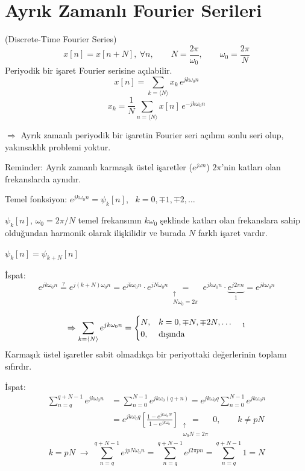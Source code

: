 \documentclass[11pt,a4paper]{article}
\begin{document}

\section{Ayrık Zamanlı Fourier Serileri}
(Discrete-Time Fourier Series)
\[ x[n]=x[n+N],\ \forall n, \qquad N=\frac{2\pi}{\omega_0}, \qquad \omega_0=\frac{2\pi}{N} \]
Periyodik bir işaret Fourier serisine açılabilir.
\[ x[n]=\sum_{k=\langle N\rangle} x_k\, e^{jk\omega_0 n} \]
\[ x_k=\frac{1}{N}\sum_{n=\langle N\rangle} x[n]\, e^{-jk\omega_0 n} \]

$\Rightarrow$ Ayrık zamanlı periyodik bir işaretin Fourier seri açılımı sonlu seri olup, yakınsaklık problemi yoktur.

Reminder: Ayrık zamanlı karmaşık üstel işaretler ($e^{j\omega n}$) $2\pi$'nin katları olan frekanslarda aynıdır.

Temel fonksiyon: $e^{jk\omega_0 n}=\psi_k[n]$, \ $k=0,\mp1,\mp2,\dots$

$\psi_k[n]$, $\omega_0=2\pi/N$ temel frekansının $k\omega_0$ şeklinde katları olan frekanslara sahip olduğundan harmonik olarak ilişkilidir ve burada $N$ farklı işaret vardır.

$\psi_k[n]=\psi_{k+N}[n]$

İspat:
\[ e^{jk\omega_0 n} \overset{?}{=} e^{j(k+N)\omega_0 n} = e^{jk\omega_0 n}\cdot e^{jN\omega_0 n}
   \underset{\substack{\uparrow\\ N\omega_0=2\pi}}{=} e^{jk\omega_0 n}\cdot \underbrace{e^{j2\pi n}}_{1} = e^{jk\omega_0 n} \]

\[ \Rightarrow \sum_{k=\langle N\rangle} e^{jk\omega_0 n} = \begin{cases} N, & k=0,\mp N,\mp 2N,\dots\\ 0, & \text{dışında}\end{cases}\quad\text{\footnotemark} \]
Karmaşık üstel işaretler sabit olmadıkça bir periyottaki değerlerinin toplamı sıfırdır.

İspat:
\begin{align*}
\sum_{n=q}^{q+N-1} e^{jk\omega_0 n} &= \sum_{n=0}^{N-1} e^{jk\omega_0 (q+n)} = e^{jk\omega_0 q}\sum_{n=0}^{N-1} e^{jk\omega_0 n}\\
&= e^{jk\omega_0 q}\left[\frac{1-e^{jk\omega_0 N}}{1-e^{jk\omega_0}}\right] \underset{\substack{\uparrow\\ \omega_0 N=2\pi}}{=} 0, \qquad k\neq pN
\end{align*}
\[ k=pN \;\longrightarrow\; \sum_{n=q}^{q+N-1} e^{jpN\omega_0 n} = \sum_{n=q}^{q+N-1} e^{j2\pi pn} = \sum_{n=q}^{q+N-1} 1 = N \]
\end{document}
